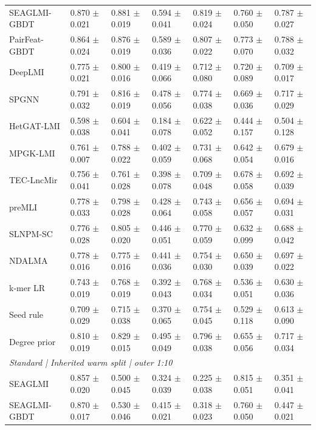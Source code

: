 \begin{landscape}
{\begin{longtable}{lllllll}
SEAGLMI-GBDT & 0.870 $\pm$ 0.021 & 0.881 $\pm$ 0.019 & 0.594 $\pm$ 0.041 & 0.819 $\pm$ 0.024 & 0.760 $\pm$ 0.050 & 0.787 $\pm$ 0.027 \\
PairFeat-GBDT & 0.864 $\pm$ 0.024 & 0.876 $\pm$ 0.019 & 0.589 $\pm$ 0.036 & 0.807 $\pm$ 0.022 & 0.773 $\pm$ 0.070 & 0.788 $\pm$ 0.032 \\
DeepLMI & 0.775 $\pm$ 0.021 & 0.800 $\pm$ 0.016 & 0.419 $\pm$ 0.066 & 0.712 $\pm$ 0.080 & 0.720 $\pm$ 0.089 & 0.709 $\pm$ 0.017 \\
SPGNN & 0.791 $\pm$ 0.032 & 0.816 $\pm$ 0.019 & 0.478 $\pm$ 0.056 & 0.774 $\pm$ 0.038 & 0.669 $\pm$ 0.036 & 0.717 $\pm$ 0.029 \\
HetGAT-LMI & 0.598 $\pm$ 0.038 & 0.604 $\pm$ 0.041 & 0.184 $\pm$ 0.078 & 0.622 $\pm$ 0.052 & 0.444 $\pm$ 0.157 & 0.504 $\pm$ 0.128 \\
MPGK-LMI & 0.761 $\pm$ 0.007 & 0.788 $\pm$ 0.022 & 0.402 $\pm$ 0.059 & 0.731 $\pm$ 0.068 & 0.642 $\pm$ 0.054 & 0.679 $\pm$ 0.016 \\
TEC-LncMir & 0.756 $\pm$ 0.041 & 0.761 $\pm$ 0.028 & 0.398 $\pm$ 0.078 & 0.709 $\pm$ 0.048 & 0.678 $\pm$ 0.058 & 0.692 $\pm$ 0.039 \\
preMLI & 0.778 $\pm$ 0.033 & 0.798 $\pm$ 0.028 & 0.428 $\pm$ 0.064 & 0.743 $\pm$ 0.058 & 0.656 $\pm$ 0.057 & 0.694 $\pm$ 0.031 \\
SLNPM-SC & 0.776 $\pm$ 0.028 & 0.805 $\pm$ 0.020 & 0.446 $\pm$ 0.051 & 0.770 $\pm$ 0.059 & 0.632 $\pm$ 0.099 & 0.688 $\pm$ 0.042 \\
NDALMA & 0.778 $\pm$ 0.016 & 0.775 $\pm$ 0.016 & 0.441 $\pm$ 0.036 & 0.754 $\pm$ 0.030 & 0.650 $\pm$ 0.039 & 0.697 $\pm$ 0.022 \\
k-mer LR & 0.743 $\pm$ 0.019 & 0.768 $\pm$ 0.019 & 0.392 $\pm$ 0.043 & 0.768 $\pm$ 0.034 & 0.536 $\pm$ 0.051 & 0.630 $\pm$ 0.036 \\
Seed rule & 0.709 $\pm$ 0.029 & 0.715 $\pm$ 0.038 & 0.370 $\pm$ 0.065 & 0.754 $\pm$ 0.045 & 0.529 $\pm$ 0.118 & 0.613 $\pm$ 0.090 \\
Degree prior & 0.810 $\pm$ 0.019 & 0.829 $\pm$ 0.015 & 0.495 $\pm$ 0.049 & 0.796 $\pm$ 0.038 & 0.655 $\pm$ 0.056 & 0.717 $\pm$ 0.034 \\
\multicolumn{7}{l}{\textit{Standard | Inherited warm split | outer 1:10}}\\
SEAGLMI & 0.857 $\pm$ 0.020 & 0.500 $\pm$ 0.045 & 0.324 $\pm$ 0.039 & 0.225 $\pm$ 0.038 & 0.815 $\pm$ 0.051 & 0.351 $\pm$ 0.041 \\
SEAGLMI-GBDT & 0.870 $\pm$ 0.017 & 0.530 $\pm$ 0.046 & 0.415 $\pm$ 0.021 & 0.318 $\pm$ 0.023 & 0.760 $\pm$ 0.050 & 0.447 $\pm$ 0.021 \\

\end{longtable}}
\end{landscape}
